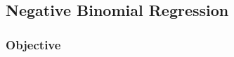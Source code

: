 \begin{comment}
While one of the primary advantages of Bayesian models is computing a full distribution rather than only a point estimate, we can generate point estimates by taking the mean of the sample distribution of predictions for each model as their respective point estimate predictions to be compared to the actual data. The models are then compared by their mean squared error (MSE), with the results shown in Table ??. There are two key features that stand out in the results in Table ??. First, both the no pooling model and the partial pooling model have lower MSEs in both training and testing. This indicates that the completely pooled model is underfit and that the no pooling and partial pooling model do improve model fit by including group parameters (team ratings in this specific case). Second, the no pooling model provides the best model fit on the training data, but provides worse model fit than the partial pooling model on the test data. This shows the effect of regularization via shrinkage to the mean that was theoretical discussed earlier in section ??. These results give empirical evidence that multilevel models and their partial pooling provide improved model fit while protecting against overfitting, and is the reason we opted to use a multilevel model as the model of choice for inferring home advantage in this thesis.
\end{comment}

\subsection{Negative Binomial Regression}

\subsubsection*{Objective}

